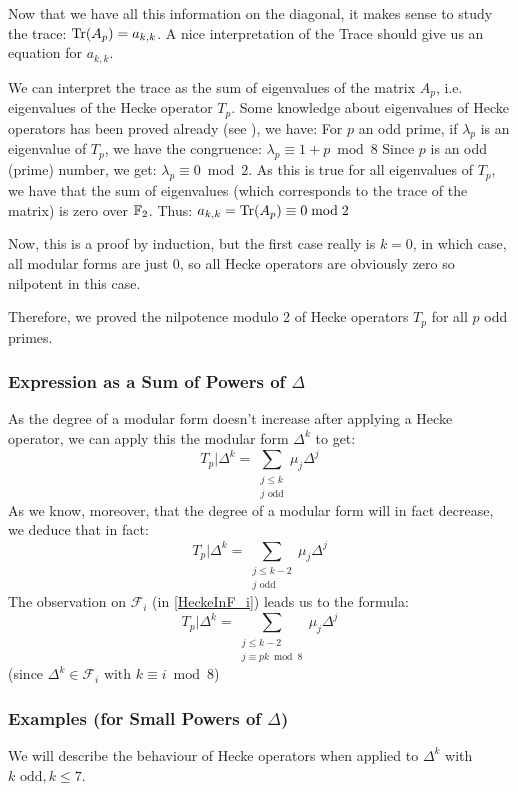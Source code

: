 Now that we have all this information on the diagonal, it makes sense to study the trace: 
$\text{Tr}(A_p) = a_{k,k}$.
A nice interpretation of the Trace should give us an equation for $a_{k,k}$.

We can interpret the trace as the sum of eigenvalues of the matrix $A_p$, i.e. eigenvalues of the Hecke operator $T_p$.
Some knowledge about eigenvalues of Hecke operators has been proved already (see \cite{EigenvaluesOfHeckeOperators}), we have:
For $p$ an odd prime, if $\lambda_p$ is an eigenvalue of $T_p$, we have the congruence: $\lambda_p \equiv 1+p \bmod 8$
Since $p$ is an odd (prime) number, we get: $\lambda_p \equiv 0 \bmod 2$.
As this is true for all eigenvalues of $T_p$, we have that the sum of eigenvalues (which corresponds to the trace of the matrix) is zero over $\mathbb{F}_2$.
Thus: 
$a_{k,k} = \text{Tr}(A_p) \equiv 0 \bmod 2$

Now, this is a proof by induction, but the first case really is $k=0$, in which case, all modular forms are just $0$, so all Hecke operators are obviously zero so nilpotent in this case.

Therefore, we proved the nilpotence modulo 2 of Hecke operators $T_p$ for all $p$ odd primes.

\subsubsection[Expression for $T_p|\Delta^k$]{Expression as a Sum of Powers of $\Delta$}
As the degree of a modular form doesn't increase after applying a Hecke operator, we can apply this the modular form $\Delta^k$ to get:
$$
T_p|\Delta^k = \sum_{\substack{j \leq k \\ j \text{ odd}}} \mu_j\Delta^j
$$
As we know, moreover, that the degree of a modular form will in fact decrease, we deduce that in fact:
\[
T_p|\Delta^k = \sum_{\substack{j \leq k-2\\ j \text{ odd}}} \mu_j\Delta^j
\label{eq:TpDelta^k} \tag{*}
\]
The observation on $\mathcal{F}_i$ (in \ref{HeckeInF_i}) leads us to the formula:
\[
T_p|\Delta^k = \sum_{\substack{j \leq k-2\\ j \equiv pk \bmod 8}} \mu_j\Delta^j
\label{eq:TpDelta^k_bis} \tag{**}
\]
(since $\Delta^k \in \mathcal{F}_i \text{ with } k \equiv i \bmod 8$)

\subsubsection{Examples (for Small Powers of $\Delta$)}
We will describe the behaviour of Hecke operators when applied to $\Delta^k$ with $k \text{ odd}, k \leq 7$.

